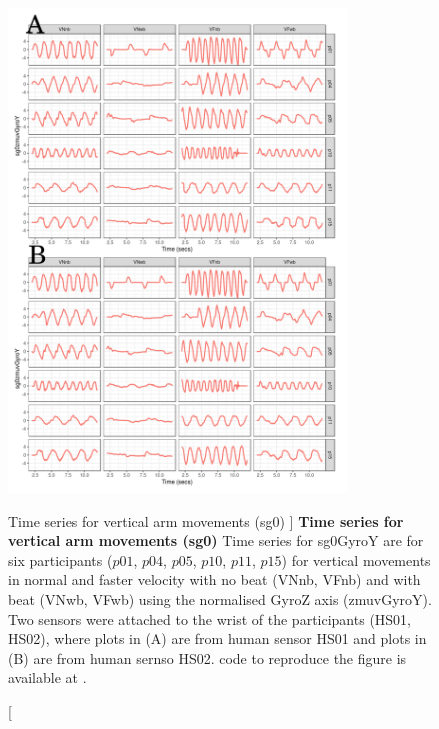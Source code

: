 \begin{figure}
\centering
\includegraphics[width=0.8\textwidth]{ts_V_sg0}
	\caption
	[Time series for vertical arm movements (sg0) ]{
	{\bf Time series for vertical arm movements (sg0)}
		Time series for sg0GyroY  are for six participants 
		($p01$, $p04$, $p05$, $p10$, $p11$, $p15$) 
		for vertical movements in normal and faster velocity with
		no beat	(VNnb, VFnb) and with beat (VNwb, VFwb) using 
		the normalised GyroZ axis (zmuvGyroY).
		Two sensors were attached to the wrist of the participants (HS01, HS02),
		where plots in (A) are from human sensor HS01 and
		plots in (B) are from human sernso HS02.
	\R code to reproduce the figure is available at 
	.
	}
    \label{fig:tssg0gyroY-hii}
\end{figure}


